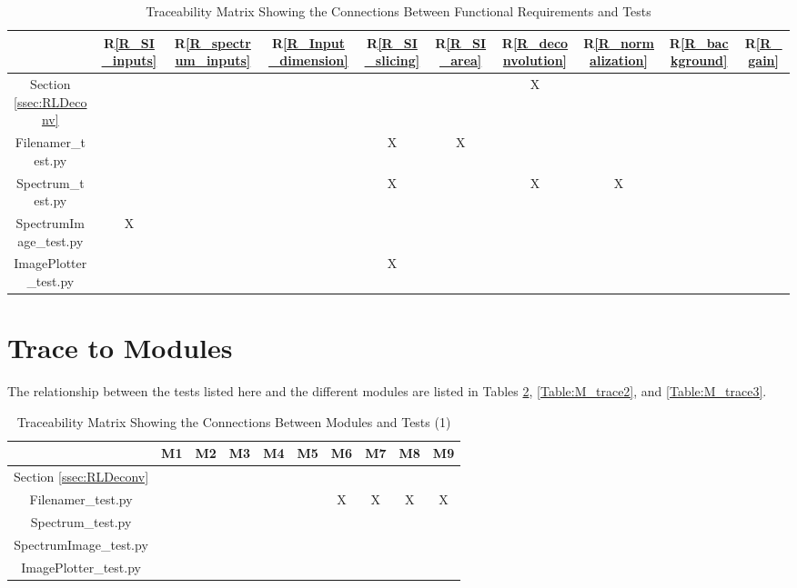 \documentclass[12pt, titlepage]{article}
\newcommand{\rref}[1]{R\ref{#1}}
\begin{document}
\begin{table}[h]
    \centering
    \begin{tabular}{|c|c|c|c|c|c|c|c|c|c|}
        \hline
        & \rref{R_SI_inputs} & \rref{R_spectrum_inputs} & \rref{R_Input_dimension}
        & \rref{R_SI_slicing} & \rref{R_SI_area} & \rref{R_deconvolution} &
        \rref{R_normalization} & \rref{R_background} & \rref{R_gain}\\
        \hline
         Section \ref{ssec:RLDeconv} & & & & & & X & & & \\ \hline
         Filenamer\_test.py & & & & X & X & & & & \\ \hline
         Spectrum\_test.py & & & & X & & X & X & & \\ \hline
         SpectrumImage\_test.py & X & & & & & & & & \\ \hline
         ImagePlotter\_test.py & & & & X & & & & & \\ \hline
    \end{tabular}
    \caption{Traceability Matrix Showing the Connections Between Functional
        Requirements and Tests}
    \label{Table:R_trace}
\end{table}

\section{Trace to Modules}
The relationship between the tests listed here and the different modules are
listed in Tables \ref{Table:M_trace1}, \ref{Table:M_trace2}, and
\ref{Table:M_trace3}.
		
\begin{table}[h!]
    \centering
    \begin{tabular}{|c|c|c|c|c|c|c|c|c|c|}
        \hline
        & M1 & M2 & M3 & M4 & M5 & M6 & M7 & M8 & M9 \\
        \hline
        Section \ref{ssec:RLDeconv} & & & & & & & & & \\ \hline
        Filenamer\_test.py & & & & & & X & X & X & X \\ \hline
        Spectrum\_test.py & & & & & & & & & \\ \hline
        SpectrumImage\_test.py & & & & & & & & &  \\ \hline
        ImagePlotter\_test.py & & & & & & & & & \\ \hline
    \end{tabular}
    \caption{Traceability Matrix Showing the Connections Between Modules and Tests (1)}
    \label{Table:M_trace1}
\end{table}
\end{document}
